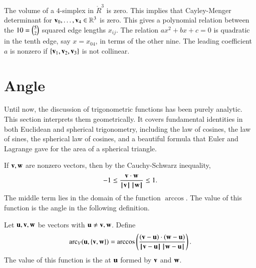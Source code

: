 \begin{remark}[]\label{rem:CM5}
  The volume of a $4$-simplex in $\ring{R}^3$ is zero.  This implies
  that Cayley-Menger determinant for ${\mathbf v}_0,\ldots,{\mathbf v}_4\in\mathbb{R}^3$
  is zero.  %
  This gives a polynomial relation between the $10 = \tbinom{5}{2}$
  squared edge lengths $x_{ij}$.  The relation $a x^2 + b x + c=0$ is
  quadratic in the tenth edge, say $x=x_{04}$, in terms of the other
  nine. The leading coefficient $a$ is nonzero if $\{{\mathbf v}_1,{\mathbf v}_2,{\mathbf v}_3\}$
  is not collinear.%
\end{remark}

\section{Angle}\label{sec:angle}

Until now, the discussion of trigonometric functions has been purely
analytic.  This section interprets them geometrically.  It covers
fundamental identities in both Euclidean and spherical trigonometry,
including the law of cosines, the law of sines, the spherical law of
cosines, and a beautiful formula that Euler and Lagrange gave for the area of a spherical triangle.

If ${\mathbf v},{\mathbf w}$ are nonzero vectors, then by the
Cauchy-Schwarz inequality,
\[ -1 \le \frac{{\mathbf v}\cdot {\mathbf w}}{{{\hskip0.1em|\hskip-0.15em|\hskip0.1em}{\mathbf v}{\hskip0.1em|\hskip-0.15em|\hskip0.1em}}\,{{\hskip0.1em|\hskip-0.15em|\hskip0.1em}{\mathbf w}{\hskip0.1em|\hskip-0.15em|\hskip0.1em}}}
  \le 1.\]  The middle term  lies in the
domain of the function $\arccos$. The value of this function is the angle in  the following
definition.  %
%
%

\begin{definition}\label{def:angle}
Let ${\mathbf u},{\mathbf v},{\mathbf w}$ be vectors with ${\mathbf u}\ne {\mathbf v},{\mathbf w}$.
Define 
\[ 
  \arc_V(\u,\{\v,\w\}) = \arccos\left(\frac{(\v-\u)\cdot 
(\w-\u)}{\norm{\v}{\u}\,\norm{\w}{\u}}\right).
\] 
The value of this function is the  at ${\mathbf u}$ formed by
${\mathbf v}$ and ${\mathbf w}$.  %
%
%
%
%
\end{definition}

